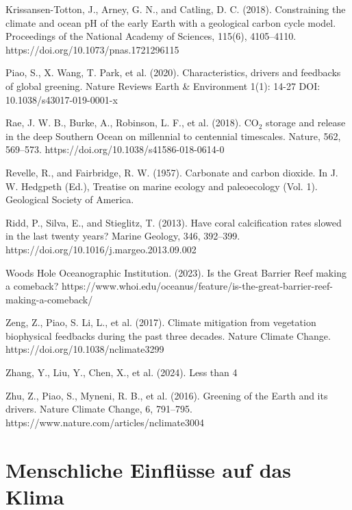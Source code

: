 \documentclass[12pt,paper=a4,DIV=12,parskip=never,chapterprefix=false,headings=standardclasses]{scrreprt}
\newcommand{\FigureNumbersBySection}{%
  \counterwithout{figure}{chapter}%
  \counterwithin{figure}{section}%
}
\begin{document}
Krissansen-Totton, J., Arney, G. N., and Catling, D. C. (2018). Constraining the climate and ocean pH of the early Earth with a geological carbon cycle model. Proceedings of the National Academy of Sciences, 115(6), 4105–4110. https://doi.org/10.1073/pnas.1721296115

Piao, S., X. Wang, T. Park, et al. (2020). Characteristics, drivers and feedbacks of global greening. Nature Reviews Earth \& Environment 1(1): 14-27 DOI: 10.1038/s43017-019-0001-x

Rae, J. W. B., Burke, A., Robinson, L. F., et al. (2018). CO$_2$ storage and release in the deep Southern Ocean on millennial to centennial timescales. Nature, 562, 569–573. https://doi.org/10.1038/s41586-018-0614-0

Revelle, R., and Fairbridge, R. W. (1957). Carbonate and carbon dioxide. In J. W. Hedgpeth (Ed.), Treatise on marine ecology and paleoecology (Vol. 1). Geological Society of America.

Ridd, P., Silva, E., and Stieglitz, T. (2013). Have coral calcification rates slowed in the last twenty years? Marine Geology, 346, 392–399. https://doi.org/10.1016/j.margeo.2013.09.002

Woods Hole Oceanographic Institution. (2023). Is the Great Barrier Reef making a comeback? https://www.whoi.edu/oceanus/feature/is-the-great-barrier-reef-making-a-comeback/

Zeng, Z., Piao, S. Li, L., et al. (2017). Climate mitigation from vegetation biophysical feedbacks during the past three decades. Nature Climate Change. https://doi.org/10.1038/nclimate3299

Zhang, Y., Liu, Y., Chen, X., et al. (2024). Less than 4%

Zhu, Z., Piao, S., Myneni, R. B., et al. (2016). Greening of the Earth and its drivers. Nature Climate Change, 6, 791–795. https://www.nature.com/articles/nclimate3004
\endgroup

\FigureNumbersBySection
\chapter{Menschliche Einflüsse auf das Klima}
\end{document}
